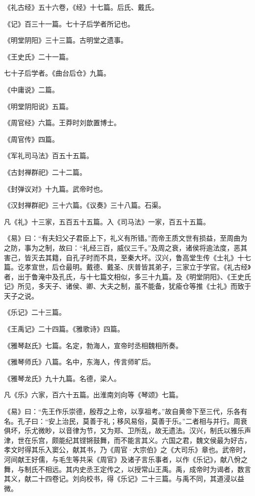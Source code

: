 \documentclass[]{article}
\begin{document}
《礼古经》五十六卷，《经》十七篇。后氏、戴氏。

《记》百三十一篇。七十子后学者所记也。

《明堂阴阳》三十三篇。古明堂之遗事。

《王史氏》二十一篇。

七十子后学者。《曲台后仓》九篇。

《中庸说》二篇。

《明堂阴阳说》五篇。

《周官经》六篇。王莽时刘歆置博士。

《周官传》四篇。

《军礼司马法》百五十五篇。

《古封禅群祀》二十二篇。

《封弹议对》十九篇。武帝时也。

《汉封禅群祀》三十六篇。《议奏》三十八篇。石渠。

凡《礼》十三家，五百五十五篇。入《司马法》一家，百五十五篇。

《易》曰：``有夫妇父子君臣上下，礼义有所错。''而帝王质文世有损益，至周曲为之防，事为之制，故曰：``礼经三百，威仪三千。''及周之衰，诸侯将逾法度，恶其害己，皆灭去其籍，自孔子时而不具，至秦大坏。汉兴，鲁高堂生传《士礼》十七篇。讫孝宣世，后仓最明。戴德、戴圣、庆普皆其弟子，三家立于学官。《礼古经》者，出于鲁淹中及孔氏，与十七篇文相似，多三十九篇。及《明堂阴阳》、《王史氏记》所见，多天子、诸侯、卿、大夫之制，虽不能备，犹瘉仓等推《士礼》而致于天子之说。

《乐记》二十三篇。

《王禹记》二十四篇。《雅歌诗》四篇。

《雅琴赵氏》七篇。名定，勃海人，宣帝时丞相魏相所奏。

《雅琴师氏》八篇。名中，东海人，传言师旷后。

《雅琴龙氏》九十九篇。名德，梁人。

凡《乐》六家，百六十五篇。出淮南刘向等《琴颂》七篇。

《易》曰：``先王作乐崇德，殷荐之上帝，以享祖考。''故自黄帝下至三代，乐各有名。孔子曰：``安上治民，莫善于礼；移风易俗，莫善于乐。''二者相与并行。周衰俱坏，乐尤微眇，以音律为节，又为郑、卫所乱，故无遗法。汉兴，制氏以雅乐声津，世在乐宫，颇能纪其铿锵鼓舞，而不能言其义。六国之君，魏文侯最为好古，孝文时得其乐入窦公，献其书，乃《周官·大宗伯》之《大司乐》章也。武帝时，河间献王好儒，与毛生等共采《周官》及诸子言乐事者，以作《乐记》，献八佾之舞，与制氏不相远。其内史丞王定传之，以授常山王禹。禹，成帝时为谒者，数言其义，献二十四卷记。刘向校书，得《乐记》二十三篇。与禹不同，其道浸以益微。
\end{document}
